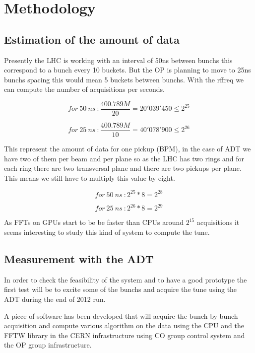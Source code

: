 %

\chapter{Methodology}

\section{Estimation of the amount of data}

Presently the \gls{LHC} is working with an interval of 50ns between 
\glspl{bunch} this correspond to a bunch every 10 \glspl{bucket}. But the 
\gls{OP} is planning to move to 25ns \glspl{bunch} spacing this would mean 
5 \glspl{bucket} between \glspl{bunch}. With the \gls{rffreq} we can compute 
the number of acquisitions per seconds.

$$for~50~ns~: \frac{400.789M}{20} = 20'039'450 \leq 2^{25}$$

$$for~25~ns~: \frac{400.789M}{10} = 40'078'900 \leq 2^{26}$$ 

This represent the amount of data for one pickup (\gls{BPM}), in the case of 
\gls{ADT} we have two of them per beam and per plane so as the \gls{LHC} has 
two rings and for each ring there are two transversal plane and there are 
two pickups per plane. This means we still have to multiply this value by 
eight.

$$for~50~ns~: 2^{25} * 8 = 2^{28}$$

$$for~25~ns~: 2^{26} * 8 = 2^{29}$$

As \glspl{FFT} on \glspl{GPU} start to be be faster than \glspl{CPU} around 
$2^{15}$ acquisitions it seems interesting to study this kind of system to 
compute the \gls{tune}.

\section{Measurement with the ADT}

In order to check the feasibility of the system and to have a good prototype
the first test will be to excite some of the \glspl{bunch} and acquire the
\gls{tune} using the \gls{ADT} during the end of 2012 run.

A piece of software has been developed that will acquire the bunch by bunch 
acquisition and compute various algorithm on the data using the \gls{CPU} 
and the \gls{FFTW} library in the \gls{CERN} infrastructure using \gls{CO} 
group control system and the \gls{OP} group infrastructure.

